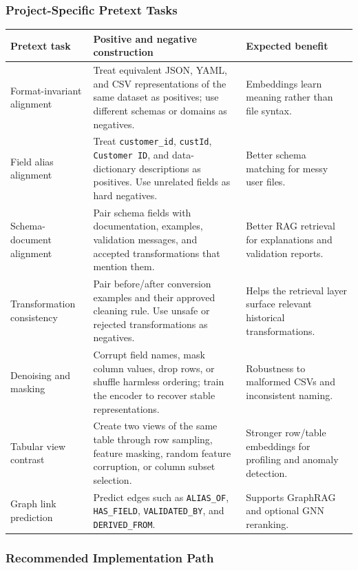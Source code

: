\subsubsection{Project-Specific Pretext Tasks}

\begin{tabularx}{\textwidth}{p{}X p{}}
\toprule
\textbf{Pretext task} & \textbf{Positive and negative construction} & \textbf{Expected benefit} \\
\midrule
Format-invariant alignment & Treat equivalent JSON, YAML, and CSV representations of the same dataset as positives; use different schemas or domains as negatives. & Embeddings learn meaning rather than file syntax. \\
Field alias alignment & Treat \texttt{customer\_id}, \texttt{custId}, \texttt{Customer ID}, and data-dictionary descriptions as positives. Use unrelated fields as hard negatives. & Better schema matching for messy user files. \\
Schema-document alignment & Pair schema fields with documentation, examples, validation messages, and accepted transformations that mention them. & Better RAG retrieval for explanations and validation reports. \\
Transformation consistency & Pair before/after conversion examples and their approved cleaning rule. Use unsafe or rejected transformations as negatives. & Helps the retrieval layer surface relevant historical transformations. \\
Denoising and masking & Corrupt field names, mask column values, drop rows, or shuffle harmless ordering; train the encoder to recover stable representations. & Robustness to malformed CSVs and inconsistent naming. \\
Tabular view contrast & Create two views of the same table through row sampling, feature masking, random feature corruption, or column subset selection. & Stronger row/table embeddings for profiling and anomaly detection. \\
Graph link prediction & Predict edges such as \texttt{ALIAS\_OF}, \texttt{HAS\_FIELD}, \texttt{VALIDATED\_BY}, and \texttt{DERIVED\_FROM}. & Supports GraphRAG and optional GNN reranking. \\
\bottomrule
\end{tabularx}

\subsubsection{Recommended Implementation Path}

